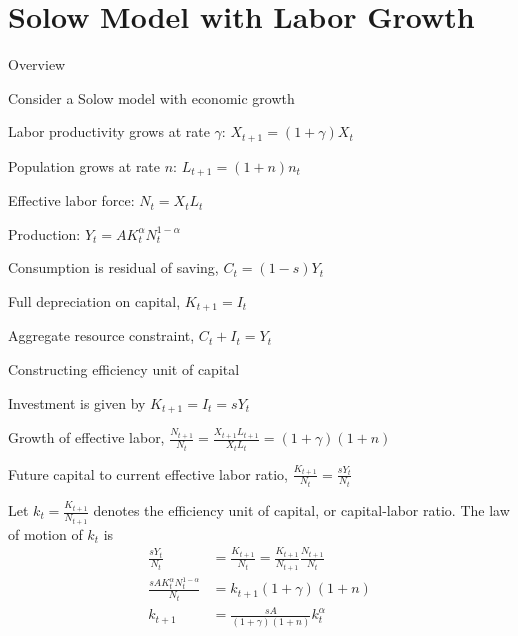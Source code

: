 \documentclass[11pt,aspectratio=169,usenames,dvipsnames]{beamer}
\let\tempone\itemize
\let\temptwo\enditemize
\renewenvironment{itemize}{\tempone\addtolength{\itemsep}{\fill}}{\temptwo}
\begin{document}
\section{Solow Model with Labor Growth}
\label{sec:Solow_Model_with_Labor_Growth}

\begin{frame}{Overview}
\label{slide:Overview}
\begin{itemize}
    \item Consider a Solow model with economic growth
    \item Labor productivity grows at rate $ \gamma $: $ \displaystyle X_{t+1} = (1 + \gamma) X_{t} $
    \item Population grows at rate $ n $: $ \displaystyle L_{t+1} = (1 + n) n_{t} $
    \item Effective labor force: $ \displaystyle N_{t} = X_{t} L_{t} $
    \item Production: $ \displaystyle Y_{t} = A K_{t}^{\alpha} N_{t}^{1-\alpha} $
    \item Consumption is residual of saving, $ \displaystyle C_{t} = (1 - s) Y_{t} $
    \item Full depreciation on capital, $ K_{t+1} = I_{t} $
    \item Aggregate resource constraint, $ \displaystyle C_{t} + I_{t} = Y_{t} $
\end{itemize}
\end{frame}


\begin{frame}{Constructing efficiency unit of capital}
\label{slide:Constructing_capital_per_effective_labor}
    \begin{itemize}
        \item Investment is given by $ \displaystyle K_{t+1} = I_{t} = s Y_{t} $
        \item Growth of effective labor, $ \displaystyle \frac{N_{t+1}}{N_{t}} = \frac{X_{t+1} L_{t+1}}{X_{t}L_{t}} = (1 + \gamma)(1 + n) $
        \item Future capital to current effective labor ratio, $ \displaystyle \frac{K_{t+1}}{N_{t}} = \frac{s Y_{t}}{N_{t}} $
        \item Let $ k_{t} = \frac{K_{t+1}}{N_{t+1}} $ denotes the efficiency unit of capital, or capital-labor ratio. The law of motion of $ k_{t} $ is
        \[
        \begin{split}
            \frac{s Y_{t}}{N_{t}}
                & = \frac{K_{t+1}}{N_{t}} = \frac{K_{t+1}}{N_{t+1}} \frac{N_{t+1}}{N_{t}}
            \\
            \frac{s A K_{t}^{\alpha} N_{t}^{1-\alpha}}{N_{t}}
                & = k_{t+1} (1+\gamma)(1+n)
            \\
            k_{t+1}
                & = \frac{s A}{(1+\gamma)(1+n)} k_{t}^{\alpha}
            \\
        \end{split}
        \]
    \end{itemize}
\end{frame}
\end{document}
